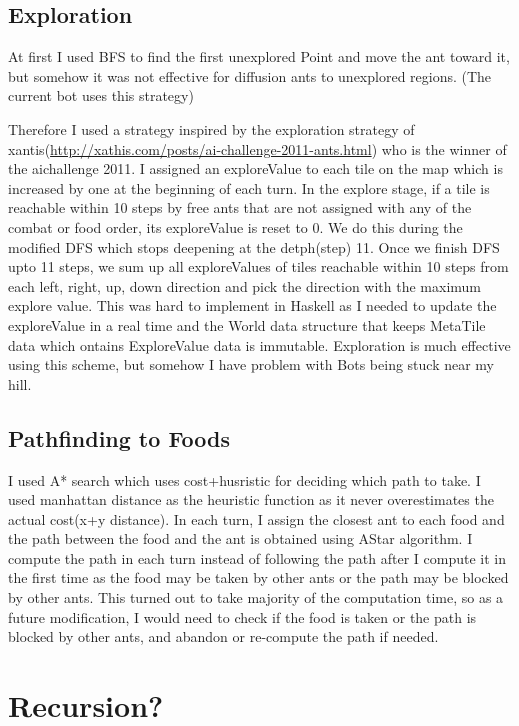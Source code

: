 \documentclass[11pt]{article}
\begin{document}
\subsection{Exploration}
\label{sec-4-1}


At first I used BFS to find the first unexplored Point and move the ant toward it, but somehow it was not effective for diffusion ants to unexplored regions. (The current bot uses this strategy)

Therefore I used a strategy inspired by the exploration strategy of xantis(\href{http://xathis.com/posts/ai-challenge-2011-ants.html}{http://xathis.com/posts/ai-challenge-2011-ants.html}) who is the winner of the aichallenge 2011. I assigned an exploreValue to each tile on the map which is increased by one at the beginning of each turn. In the explore stage, if a tile is reachable within 10 steps by free ants that are not assigned with any of the combat or food order, its exploreValue is reset to 0. We do this during the modified DFS which stops deepening at the detph(step) 11. Once we finish DFS upto 11 steps, we sum up all exploreValues of tiles reachable within 10 steps from each left, right, up, down direction and pick the direction with the maximum explore value. This was hard to implement in Haskell as I needed to update the exploreValue in a real time and the World data structure that keeps MetaTile data which ontains ExploreValue data is immutable. Exploration is much effective using this scheme, but somehow I have problem with Bots being stuck near my hill.
\subsection{Pathfinding to Foods}
\label{sec-4-2}


I used A* search which uses cost+husristic for deciding which path to take. I used manhattan distance as the heuristic function as it never overestimates the actual cost(x+y distance). In each turn, I assign the closest ant to each food and the path between the food and the ant is obtained using AStar algorithm. I compute the path in each turn instead of following the path after I compute it in the first time as the food may be taken by other ants or the path may be blocked by other ants. This turned out to take majority of the computation time, so as a future modification, I would need to check if the food is taken or the path is blocked by other ants, and abandon or re-compute the path if needed.  
\section{Recursion?}
\label{sec-5}
\end{document}
